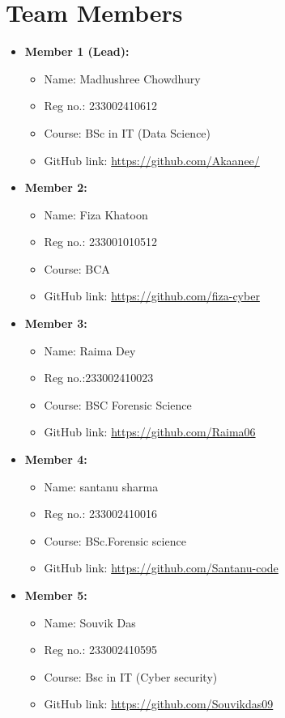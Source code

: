 \documentclass[a4paper,12pt]{report}
\begin{document}
\section*{Team Members}
\begin{itemize}
    \item \textbf{Member 1 (Lead):} 
    \begin{itemize}
        \item Name: Madhushree Chowdhury
        \item Reg no.: 233002410612
        \item Course: BSc in IT (Data Science)
        \item GitHub link: \url{https://github.com/Akaanee/}
    \end{itemize}

    \item \textbf{Member 2:} 
    \begin{itemize}
        \item Name: Fiza Khatoon 
        \item Reg no.: 233001010512
        \item Course: BCA
        \item GitHub link: \url{https://github.com/fiza-cyber}
    \end{itemize}

    \item \textbf{Member 3:} 
    \begin{itemize}
        \item Name: Raima Dey
        \item Reg no.:233002410023 
        \item Course: BSC Forensic Science
        \item GitHub link: \url{https://github.com/Raima06}
    \end{itemize}

    \item \textbf{Member 4:} 
    \begin{itemize}
        \item Name: santanu sharma
        \item Reg no.: 233002410016
        \item Course: BSc.Forensic science
        \item GitHub link: \url{https://github.com/Santanu-code}
    \end{itemize}
    \newpage
    \item \textbf{Member 5:} 
    \begin{itemize}
        \item Name: Souvik Das
        \item Reg no.: 233002410595
        \item Course: Bsc in IT (Cyber security) 
        \item GitHub link: \url{https://github.com/Souvikdas09}
    \end{itemize}
\end{itemize}
\vspace{16pt}
\end{document}
